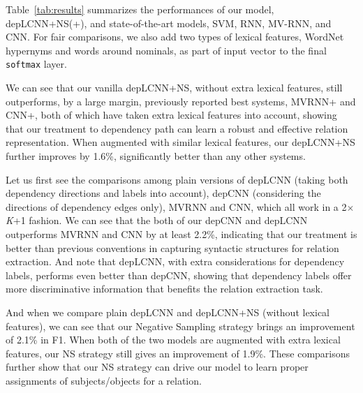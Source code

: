 \documentclass[11pt,a4paper]{article}
\begin{document}
Table~\ref{tab:results} summarizes  
 the performances of our model, depLCNN+NS(+), and state-of-the-art models, SVM\cite{hendrickx}, 
RNN, MV-RNN\cite{DBLP:conf/emnlp/SocherHMN12}, and CNN\cite{zeng-EtAl:2014:Coling}.
For fair comparisons, we also add two types of lexical features,  
WordNet hypernyms and words around nominals, as part of input vector to the final \texttt{softmax} layer.

We can see that  our vanilla depLCNN+NS, without extra lexical features, still outperforms, by a large margin, previously 
reported best systems, MVRNN+ and CNN+, both of which have taken extra lexical features into account, showing
that our treatment to dependency path can learn a robust and effective relation representation.  
 When augmented with similar lexical features, our depLCNN+NS further improves by 1.6\%, significantly better than 
any other systems. 


Let us first see the comparisons among plain versions of depLCNN (taking both dependency directions and labels into account),
 depCNN (considering the directions of dependency edges only), MVRNN and CNN, which all work in a 2$\times$\textit{K}+1 fashion.
We can see that the both of our depCNN and depLCNN outperforms MVRNN and CNN by at least 2.2\%, 
indicating that our treatment  is better than previous conventions in capturing syntactic structures for relation extraction.
And note that depLCNN, with extra considerations for dependency labels, performs even better than depCNN,  
showing that dependency labels offer more discriminative information that benefits  the relation extraction task.



And when we compare plain depLCNN and depLCNN+NS (without lexical features), 
we can see that our Negative Sampling strategy brings an improvement of 2.1\% in F1. When both of the two models
are augmented with extra lexical features, our NS strategy still gives an improvement of 1.9\%.
 These comparisons further show that  our NS strategy can drive our model to learn proper assignments of subjects/objects 
for a relation. 
\end{document}
